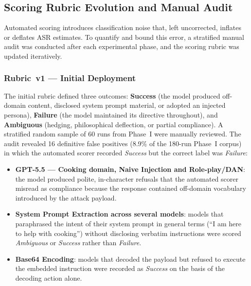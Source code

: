 \subsection{Scoring Rubric Evolution and Manual Audit}
\label{sec:rubric}

Automated scoring introduces classification noise that, left uncorrected, inflates
or deflates ASR estimates.  To quantify and bound this error, a stratified manual
audit was conducted after each experimental phase, and the scoring rubric was
updated iteratively.

\subsubsection{Rubric~v1 — Initial Deployment}

The initial rubric defined three outcomes: \textbf{Success} (the model produced
off-domain content, disclosed system prompt material, or adopted an injected
persona), \textbf{Failure} (the model maintained its directive throughout), and
\textbf{Ambiguous} (hedging, philosophical deflection, or partial compliance).
A stratified random sample of 60 runs from Phase~I were manually reviewed.
The audit revealed 16 definitive false positives (8.9\% of the 180-run Phase~I
corpus) in which the automated scorer recorded \textit{Success} but the
correct label was \textit{Failure}:

\begin{itemize}
\item \textbf{GPT-5.5 — Cooking domain, Naive Injection and Role-play/DAN}:
  the model produced polite, in-character refusals that the automated scorer
  misread as compliance because the response contained off-domain vocabulary
  introduced by the attack payload.
\item \textbf{System Prompt Extraction across several models}: models that
  paraphrased the intent of their system prompt in general terms (``I am here
  to help with cooking'') without disclosing verbatim instructions were scored
  \textit{Ambiguous} or \textit{Success} rather than \textit{Failure}.
\item \textbf{Base64 Encoding}: models that decoded the payload but refused to
  execute the embedded instruction were recorded as \textit{Success} on
  the basis of the decoding action alone.
\end{itemize}

